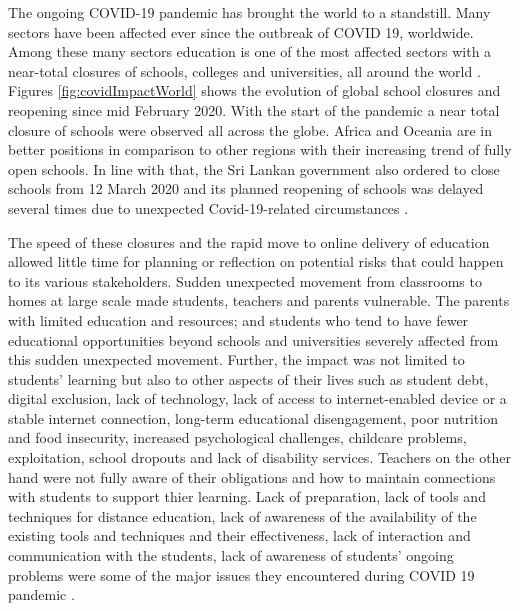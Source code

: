 \documentclass[11pt,a4paper,]{article}
\begin{document}
The ongoing COVID-19 pandemic has brought the world to a standstill. Many sectors have been affected ever since the outbreak of COVID 19, worldwide. Among these many sectors education is one of the most affected sectors with a near-total closures of schools, colleges and universities, all around the world \autocite{daniel2020education}. Figures \ref{fig:covidImpactWorld} shows the evolution of global school closures and reopening since mid February 2020. With the start of the pandemic a near total closure of schools were observed all across the globe. Africa and Oceania are in better positions in comparison to other regions with their increasing trend of fully open schools. In line with that, the Sri Lankan government also ordered to close schools from 12 March 2020 and its planned reopening of schools was delayed several times due to unexpected Covid-19-related circumstances \autocite{wikieducation}.

The speed of these closures and the rapid move to online delivery of education allowed little time for planning or reflection on potential risks that could happen to its various stakeholders. Sudden unexpected movement from classrooms to homes at large scale made students, teachers and parents vulnerable. The parents with limited education and resources; and students who tend to have fewer educational opportunities beyond schools and universities severely affected from this sudden unexpected movement. Further, the impact was not limited to students' learning but also to other aspects of their lives such as student debt, digital exclusion, lack of technology, lack of access to internet-enabled device or a stable internet connection, long-term educational disengagement, poor nutrition and food insecurity, increased psychological challenges, childcare problems, exploitation, school dropouts and lack of disability services. Teachers on the other hand were not fully aware of their obligations and how to maintain connections with students to support thier learning. Lack of preparation, lack of tools and techniques for distance education, lack of awareness of the availability of the existing tools and techniques and their effectiveness, lack of interaction and communication with the students, lack of awareness of students' ongoing problems were some of the major issues they encountered during COVID 19 pandemic \autocite{drane2020impact,daniel2020education,unescoadverse2020}.
\end{document}
